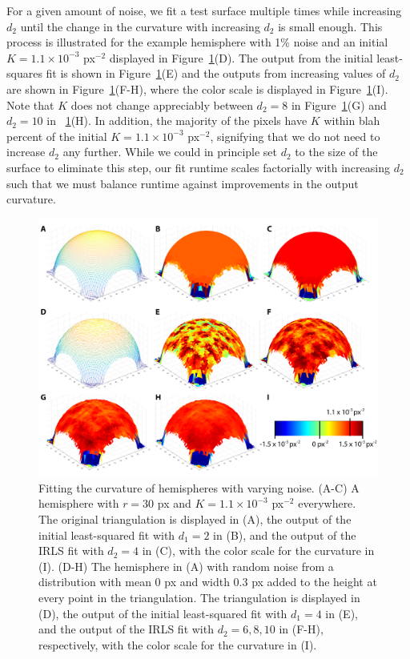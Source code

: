 For a given amount of noise, we fit a test surface multiple times while increasing $d_2$ until the change in the curvature with increasing $d_2$ is small enough.
This process is illustrated for the example hemisphere with 1\% noise and an initial $K =1.1 \times 10^{-3}$ px$^{-2}$ displayed in Figure~\ref{f:3-CurvFitSphere}(D).
The output from the initial least-squares fit is shown in Figure~\ref{f:3-CurvFitSphere}(E) and the outputs from increasing values of $d_2$ are shown in Figure~\ref{f:3-CurvFitSphere}(F-H), where the color scale is displayed in Figure~\ref{f:3-CurvFitSphere}(I).
Note that $K$ does not change appreciably between $d_2 = 8$ in Figure~\ref{f:3-CurvFitSphere}(G) and $d_2 = 10$ in ~\ref{f:3-CurvFitSphere}(H).
In addition, the majority of the pixels have $K$ within blah percent of the initial $K =1.1 \times 10^{-3}$ px$^{-2}$, signifying that we do not need to increase $d_2$ any further.
While we could in principle set $d_2$ to the size of the surface to eliminate this step, our fit runtime scales factorially with increasing $d_2$ such that we must balance runtime against improvements in the output curvature.
\begin{figure}
  \centering
  \includegraphics{figures/C3/Ch3-Figs_CurvFitSphere.png}
  \caption{Fitting the curvature of hemispheres with varying noise.
  (A-C) A hemisphere with $r = 30$ px and $K = 1.1 \times 10^{-3}$ px$^{-2}$ everywhere.
  The original triangulation is displayed in (A), the output of the initial least-squared fit with $d_1=2$ in (B), and the output of the IRLS fit with $d_2=4$ in (C), with the color scale for the curvature in (I).
  (D-H) The hemisphere in (A) with random noise from a distribution with mean 0 px and width 0.3 px added to the height at every point in the triangulation.
  The triangulation is displayed in (D), the output of the initial least-squared fit with $d_1=4$ in (E), and the output of the IRLS fit with $d_2=6,8,10$ in (F-H), respectively, with the color scale for the curvature in (I).}\label{f:3-CurvFitSphere}
\end{figure}

